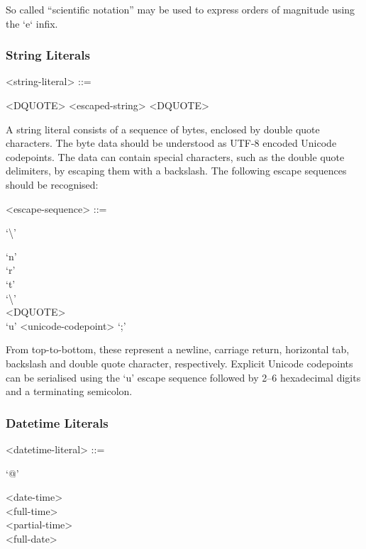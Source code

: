 So called ``scientific notation'' may be used to express orders of
magnitude using the `e` infix.

\subsubsection{String Literals}

\begin{grammar}
  <string-literal> ::= \begin{syntdiag}
    <DQUOTE>
    <escaped-string>
    <DQUOTE>
  \end{syntdiag}
\end{grammar}

A string literal consists of a sequence of bytes, enclosed by double
quote characters. The byte data should be understood as UTF-8 encoded
Unicode codepoints. The data can contain special characters, such as the
double quote delimiters, by escaping them with a backslash. The
following escape sequences should be recognised:

\begin{grammar}
  <escape-sequence> ::= \begin{syntdiag}
    `\textbackslash'
    \begin{stack}
      `n' \\
      `r' \\
      `t' \\
      `\textbackslash' \\
      <DQUOTE> \\
      `u' <unicode-codepoint> `;'
    \end{stack}
  \end{syntdiag}
\end{grammar}

From top-to-bottom, these represent a newline, carriage return,
horizontal tab, backslash and double quote character, respectively.
Explicit Unicode codepoints can be serialised using the `u' escape
sequence followed by 2--6 hexadecimal digits and a terminating
semicolon.

\subsubsection{Datetime Literals}

\begin{grammar}
  <datetime-literal> ::= \begin{syntdiag}
    `@'
    \begin{stack}
      <date-time> \\
      <full-time> \\
      <partial-time> \\
      <full-date>
    \end{stack}
  \end{syntdiag}
\end{grammar}

